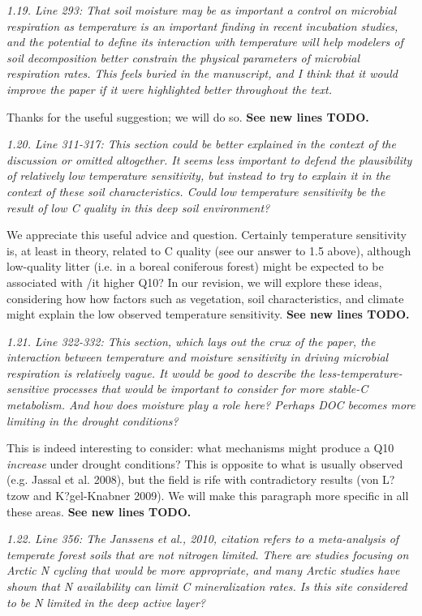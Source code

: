 \documentclass[11pt, oneside]{article}
\begin{document}
\medskip
{\it 1.19. Line 293: That soil moisture may be as important a control on microbial respiration as temperature is an important finding in recent incubation studies, and the potential to define its interaction with temperature will help modelers of soil decomposition better constrain the physical parameters of microbial respiration rates. This feels buried in the manuscript, and I think that it would improve the paper if it were highlighted better throughout the text. }

Thanks for the useful suggestion; we will do so. {\bf See new lines TODO.}

\medskip
{\it 1.20. Line 311-317: This section could be better explained in the context of the discussion or omitted altogether. It seems less important to defend the plausibility of relatively low temperature sensitivity, but instead to try to explain it in the context of these soil characteristics. Could low temperature sensitivity be the result of low C quality in this deep soil environment? }

We appreciate this useful advice and question. Certainly temperature sensitivity is, at least in theory, related to C quality (see our answer to 1.5 above), although low-quality litter (i.e. in a boreal coniferous forest) might be expected to be associated with {/it higher} Q10? In our revision, we will explore these ideas, considering how how factors such as vegetation, soil characteristics, and climate might explain the low observed temperature sensitivity. {\bf See new lines TODO.}

\medskip
{\it 1.21. Line 322-332: This section, which lays out the crux of the paper, the interaction between temperature and moisture sensitivity in driving microbial respiration is relatively vague. It would be good to describe the less-temperature-sensitive processes that would be important to consider for more stable-C metabolism. And how does moisture play a role here? Perhaps DOC becomes more limiting in the drought conditions? }

This is indeed interesting to consider: what mechanisms might produce a Q10 {\it increase} under drought conditions? This is opposite to what is usually observed (e.g. Jassal et al. 2008), but the field is rife with contradictory results (von L?tzow and K?gel-Knabner 2009). We will make this paragraph more specific in all these areas. {\bf See new lines TODO.}

\medskip
{\it 1.22. Line 356: The Janssens et al., 2010, citation refers to a meta-analysis of temperate forest soils that are not nitrogen limited. There are studies focusing on Arctic N cycling that would be more appropriate, and many Arctic studies have shown that N availability can limit C mineralization rates. Is this site considered to be N limited in the deep active layer? }
\end{document}
